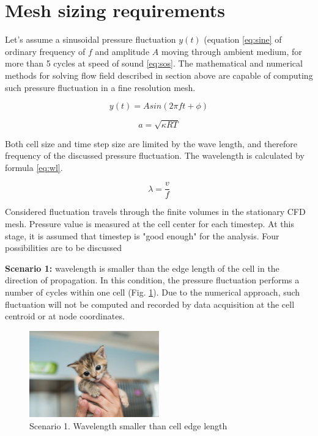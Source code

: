 \section{Mesh sizing requirements} \label{meshsize}
Let's assume a sinusoidal pressure fluctuation $y(t)$ (equation \ref{eq:sine} of ordinary frequency of $f$ and amplitude $A$ moving through ambient medium, for more than 5 cycles at speed of sound \ref{eq:sos}. The mathematical and numerical methods for solving flow field described in section above are capable of computing such pressure fluctuation in a fine resolution mesh. 

\begin{equation} \label{eq:sine}
y(t) = A sin(2 \pi f t + \phi)
\end{equation}

\begin{equation} \label{eq:sos}
a = \sqrt{\kappa R T}
\end{equation}

Both cell size and time step size are limited by the wave length, and therefore frequency of the discussed pressure fluctuation. The wavelength is calculated by formula \ref{eq:wl}.

\begin{equation} \label{eq:wl}
\lambda = \frac{v}{f}
\end{equation}

Considered fluctuation travels through the finite volumes in the stationary CFD mesh. Pressure value is measured at the cell center for each timestep. At this stage, it is assumed that timestep is "good enough" for the analysis. Four possibilities are to be discussed 

\textbf{Scenario 1:} wavelength is smaller than the edge length of the cell in the direction of propagation. In this condition, the pressure fluctuation performs a number of cycles within one cell (Fig. \ref{scen1}). Due to the numerical approach, such fluctuation will not be computed and recorded by data acquisition at the cell centroid or at node coordinates.

\begin{figure}[h!]
\centering %
\includegraphics[width=0.5\textwidth]{Pictures/kitten-placeholder.jpg}
\caption{Scenario 1. Wavelength smaller than cell edge length}
\label{scen1}
\end{figure}

